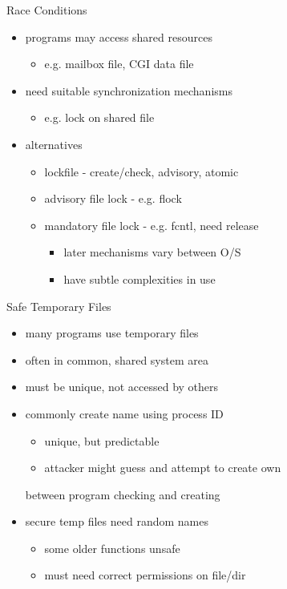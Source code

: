 \documentclass{beamer}
\begin{document}
\begin{frame}{Race Conditions}
  \begin{itemize}
  \item programs may access shared resources
    \begin{itemize}
    \item e.g. mailbox file, CGI data file
    \end{itemize}
  \item need suitable synchronization mechanisms
    \begin{itemize}
    \item e.g. lock on shared file
    \end{itemize}
  \item alternatives
    \begin{itemize}
    \item  lockfile - create/check, advisory, atomic
    \item  advisory file lock - e.g. flock
    \item  mandatory file lock - e.g. fcntl, need release
      \begin{itemize}
      \item later mechanisms vary between O/S
      \item have subtle complexities in use 
      \end{itemize}
    \end{itemize}
  \end{itemize}
\end{frame}


\begin{frame}{Safe Temporary Files}
  \begin{itemize}
  \item  many programs use temporary files
  \item  often in common, shared system area
  \item  must be unique, not accessed by others
  \item  commonly create name using process ID
    \begin{itemize}
    \item unique, but predictable
    \item attacker might guess and attempt to create own
    \end{itemize}
    between program checking and creating
  \item secure temp files need random names
    \begin{itemize}
    \item some older functions unsafe
    \item must need correct permissions on file/dir 
    \end{itemize}
  \end{itemize}
\end{frame}
\end{document}
